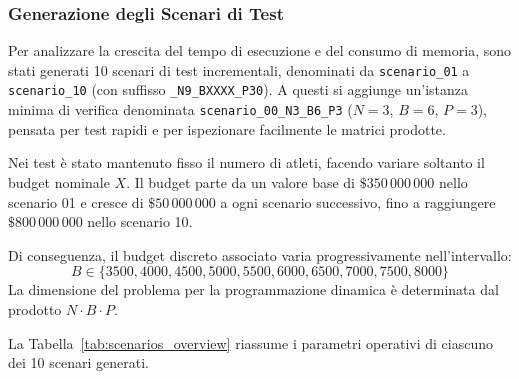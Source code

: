 \subsubsection{Generazione degli Scenari di Test}
Per analizzare la crescita del tempo di esecuzione e del consumo di memoria, sono stati generati 10 scenari di test incrementali, denominati da \texttt{scenario\_01} a \texttt{scenario\_10} (con suffisso \texttt{\_N9\_BXXXX\_P30}). A questi si aggiunge un'istanza minima di verifica denominata \texttt{scenario\_00\_N3\_B6\_P3} ($N=3$, $B=6$, $P=3$), pensata per test rapidi e per ispezionare facilmente le matrici prodotte.

Nei test è stato mantenuto fisso il numero di atleti, facendo variare soltanto il budget nominale $X$. Il budget parte da un valore base di $\$350\,000\,000$ nello scenario 01 e cresce di $\$50\,000\,000$ a ogni scenario successivo, fino a raggiungere $\$800\,000\,000$ nello scenario 10.

Di conseguenza, il budget discreto associato varia progressivamente nell'intervallo:
\[
	B \in \{3500, 4000, 4500, 5000, 5500, 6000, 6500, 7000, 7500, 8000\}
\]
La dimensione del problema per la programmazione dinamica è determinata dal prodotto $N \cdot B \cdot P$.

La Tabella~\ref{tab:scenarios_overview} riassume i parametri operativi di ciascuno dei 10 scenari generati.

